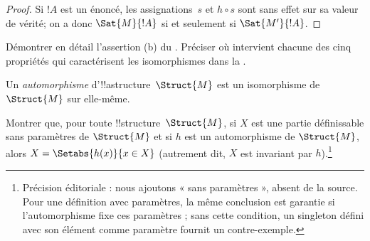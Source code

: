 \documentclass[../../../include/open-logic-section]{subfiles}
\begin{document}
\begin{proof}
Si $!A$ est un énoncé, les assignations~$s$ et $h \circ s$ sont
sans effet sur sa valeur de vérité; on a donc $\Sat{M}{!A}$
si et seulement si $\Sat{M'}{!A}$.
\end{proof}

\begin{prob}
Démontrer en détail l'assertion (b) du
. Préciser où intervient chacune
des cinq propriétés qui caractérisent les isomorphismes dans la
.
\end{prob}

\begin{defn}
Un \emph{automorphisme} d'!!a{structure}~$\Struct{M}$ est un
isomorphisme de $\Struct{M}$ sur elle-même.
\end{defn}

\begin{prob}
Montrer que, pour toute !!{structure}~$\Struct{M}$, si $X$ est une
partie définissable sans paramètres de $\Struct{M}$ et si $h$ est un automorphisme de
$\Struct{M}$, alors $X = \Setabs{h(x)}{x \in X}$ (autrement dit,
$X$ est invariant par $h$).\footnote{Précision éditoriale : nous ajoutons « sans paramètres », absent de la source. Pour une définition avec paramètres, la même conclusion est garantie si l'automorphisme fixe ces paramètres ; sans cette condition, un singleton défini avec son élément comme paramètre fournit un contre-exemple.}
\end{prob}
\end{document}
